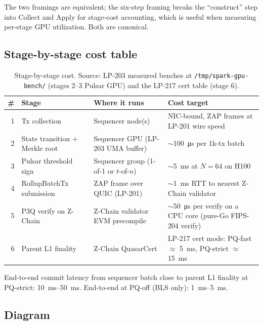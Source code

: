 The two framings are equivalent; the six-step framing breaks the
``construct'' step into Collect and Apply for stage-cost accounting,
which is useful when measuring per-stage GPU utilization. Both are
canonical.

\subsection{Stage-by-stage cost table}

\begin{table}[h]
\centering
\small
\begin{tabular}{@{}rp{3cm}p{4cm}p{4cm}@{}}
\toprule
\textbf{\#} & \textbf{Stage} & \textbf{Where it runs} & \textbf{Cost target} \\
\midrule
1 & Tx collection & Sequencer node(s) & NIC-bound, ZAP frames at LP-201 wire speed \\
2 & State transition + Merkle root & Sequencer GPU (LP-203 UMA buffer) & $\sim$\SI{100}{\micro\second} per 1k-tx batch \\
3 & Pulsar threshold sign & Sequencer group (1-of-1 or $t$-of-$n$) & $\sim$\SI{5}{\milli\second} at $N{=}64$ on H100 \\
4 & RollupBatchTx submission & ZAP frame over QUIC (LP-201) & $\sim$\SI{1}{\milli\second} RTT to nearest Z-Chain validator \\
5 & P3Q verify on Z-Chain & Z-Chain validator EVM precompile & $\sim$\SI{50}{\micro\second} per verify on a CPU core (pure-Go FIPS-204 verify) \\
6 & Parent L1 finality & Z-Chain QuasarCert & LP-217 cert mode: PQ-fast $\approx$ \SI{5}{\milli\second}, PQ-strict $\approx$ \SI{15}{\milli\second} \\
\bottomrule
\end{tabular}
\caption{Stage-by-stage cost. Source: LP-203 measured benches at
\texttt{/tmp/spark-gpu-bench/} (stages 2--3 Pulsar GPU) and the
LP-217 cert table (stage 6).}
\label{tab:stages}
\end{table}

End-to-end commit latency from sequencer batch close to parent L1
finality at PQ-strict: \SI{10}{\milli\second}--\SI{50}{\milli\second}.
End-to-end at PQ-off (BLS only):
\SI{1}{\milli\second}--\SI{5}{\milli\second}.

\subsection{Diagram}

